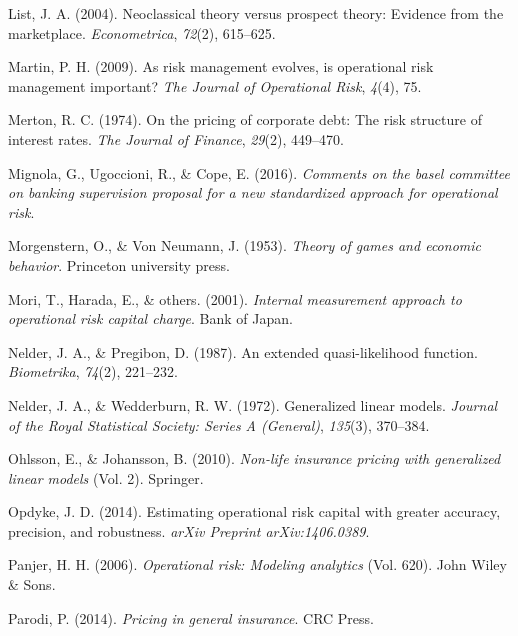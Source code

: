 \documentclass{DissertateUSU}
\begin{document}
\leavevmode\hypertarget{ref-list2004neoclassical}{}%
List, J. A. (2004). Neoclassical theory versus prospect theory: Evidence
from the marketplace. \emph{Econometrica}, \emph{72}(2), 615--625.

\leavevmode\hypertarget{ref-martin2009risk}{}%
Martin, P. H. (2009). As risk management evolves, is operational risk
management important? \emph{The Journal of Operational Risk},
\emph{4}(4), 75.

\leavevmode\hypertarget{ref-merton1974pricing}{}%
Merton, R. C. (1974). On the pricing of corporate debt: The risk
structure of interest rates. \emph{The Journal of Finance},
\emph{29}(2), 449--470.

\leavevmode\hypertarget{ref-mignola2016comments}{}%
Mignola, G., Ugoccioni, R., \& Cope, E. (2016). \emph{Comments on the
basel committee on banking supervision proposal for a new standardized
approach for operational risk}.

\leavevmode\hypertarget{ref-morgenstern1953theory}{}%
Morgenstern, O., \& Von Neumann, J. (1953). \emph{Theory of games and
economic behavior}. Princeton university press.

\leavevmode\hypertarget{ref-mori2001internal}{}%
Mori, T., Harada, E., \& others. (2001). \emph{Internal measurement
approach to operational risk capital charge}. Bank of Japan.

\leavevmode\hypertarget{ref-nelder1987extended}{}%
Nelder, J. A., \& Pregibon, D. (1987). An extended quasi-likelihood
function. \emph{Biometrika}, \emph{74}(2), 221--232.

\leavevmode\hypertarget{ref-nelder1972generalized}{}%
Nelder, J. A., \& Wedderburn, R. W. (1972). Generalized linear models.
\emph{Journal of the Royal Statistical Society: Series A (General)},
\emph{135}(3), 370--384.

\leavevmode\hypertarget{ref-ohlsson2010non}{}%
Ohlsson, E., \& Johansson, B. (2010). \emph{Non-life insurance pricing
with generalized linear models} (Vol. 2). Springer.

\leavevmode\hypertarget{ref-opdyke2014estimating}{}%
Opdyke, J. D. (2014). Estimating operational risk capital with greater
accuracy, precision, and robustness. \emph{arXiv Preprint
arXiv:1406.0389}.

\leavevmode\hypertarget{ref-panjer2006operational}{}%
Panjer, H. H. (2006). \emph{Operational risk: Modeling analytics} (Vol.
620). John Wiley \& Sons.

\leavevmode\hypertarget{ref-parodi2014pricing}{}%
Parodi, P. (2014). \emph{Pricing in general insurance}. CRC Press.
\end{document}
